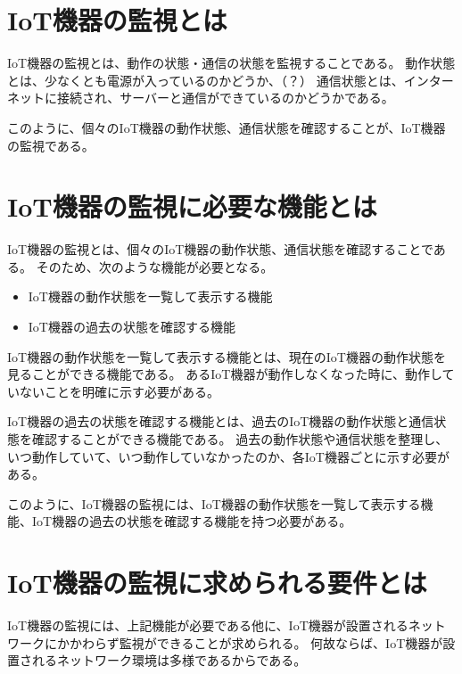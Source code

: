 \section{IoT機器の監視とは}
IoT機器の監視とは、動作の状態・通信の状態を監視することである。
動作状態とは、少なくとも電源が入っているのかどうか、（？）
通信状態とは、インターネットに接続され、サーバーと通信ができているのかどうかである。
\medskip

このように、個々のIoT機器の動作状態、通信状態を確認することが、IoT機器の監視である。

\section{IoT機器の監視に必要な機能とは}
IoT機器の監視とは、個々のIoT機器の動作状態、通信状態を確認することである。
そのため、次のような機能が必要となる。
\begin{itemize}
	\item IoT機器の動作状態を一覧して表示する機能
	\item IoT機器の過去の状態を確認する機能
\end{itemize}

IoT機器の動作状態を一覧して表示する機能とは、現在のIoT機器の動作状態を見ることができる機能である。
あるIoT機器が動作しなくなった時に、動作していないことを明確に示す必要がある。
\medskip

IoT機器の過去の状態を確認する機能とは、過去のIoT機器の動作状態と通信状態を確認することができる機能である。
過去の動作状態や通信状態を整理し、いつ動作していて、いつ動作していなかったのか、各IoT機器ごとに示す必要がある。
\medskip

このように、IoT機器の監視には、IoT機器の動作状態を一覧して表示する機能、IoT機器の過去の状態を確認する機能を持つ必要がある。

\section{IoT機器の監視に求められる要件とは}
IoT機器の監視には、上記機能が必要である他に、IoT機器が設置されるネットワークにかかわらず監視ができることが求められる。
何故ならば、IoT機器が設置されるネットワーク環境は多様であるからである。
\medskip

